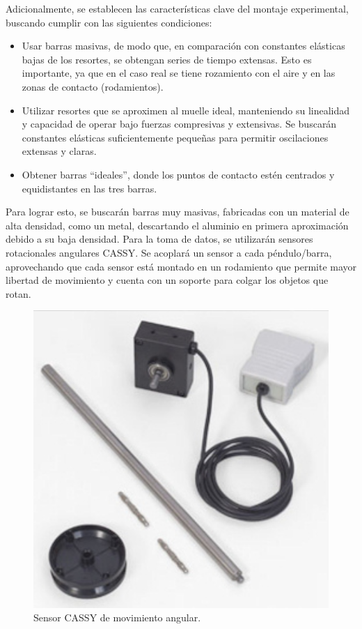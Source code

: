 Adicionalmente, se establecen las características clave del montaje
experimental, buscando cumplir con las siguientes condiciones:

\begin{itemize}
  \item Usar barras masivas, de modo que, en comparación con
    constantes elásticas bajas de los resortes, se obtengan series
    de tiempo extensas. Esto es importante, ya que en el caso real
    se tiene rozamiento con el aire y en las zonas de contacto
    (rodamientos).
  \item Utilizar resortes que se aproximen al muelle ideal,
    manteniendo su linealidad y capacidad de operar bajo fuerzas
    compresivas y extensivas. Se buscarán constantes elásticas
    suficientemente pequeñas para permitir oscilaciones extensas y
    claras.
  \item Obtener barras ``ideales'', donde los puntos de contacto
    estén centrados y equidistantes en las tres barras.
\end{itemize}

Para lograr esto, se buscarán barras muy masivas, fabricadas con
un material de alta densidad, como un metal, descartando el aluminio
en primera aproximación debido a su baja densidad. Para la toma de
datos, se utilizarán sensores rotacionales angulares CASSY. Se
acoplará un sensor a cada péndulo/barra, aprovechando que cada sensor
está montado en un rodamiento que permite mayor libertad de
movimiento y cuenta con un soporte para colgar los objetos que rotan.

\begin{figure}[htbp!]
  \centering
  \includegraphics[width=0.8\linewidth]{Figures/IM2.png}
  \caption{Sensor CASSY de movimiento angular.}
  \label{fig:cassy}
\end{figure}
